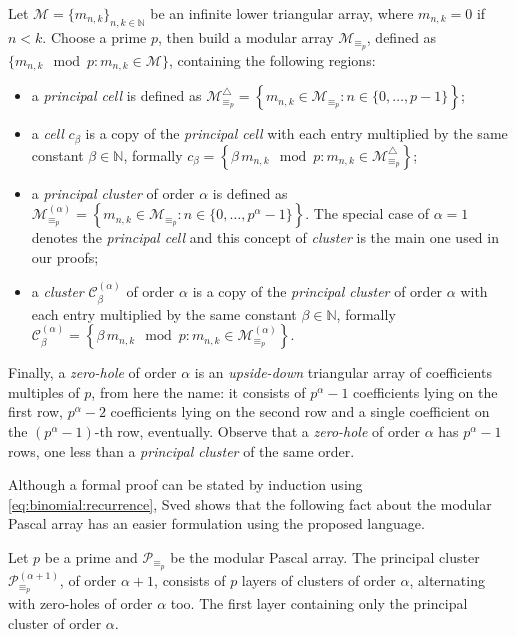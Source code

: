 Let $\mathcal{M}=\lbrace m_{n,k}\rbrace_{n,k\in\mathbb{N}}$ 
be an infinite lower triangular array, where $m_{n,k}=0$ if 
$n<k$. Choose a prime $p$, then build a modular array
$\mathcal{M}_{\equiv_{p}}$, defined as 
$\lbrace m_{n,k}\mod p : m_{n,k} \in \mathcal{M}\rbrace$, containing
the following regions:
\begin{itemize}

\item a \emph{principal cell} is %
    defined as
    $\mathcal{M}_{\equiv_{p}}^{\bigtriangleup} = 
        \left\lbrace m_{n,k}\in \mathcal{M}_{\equiv_{p}}: n\in\lbrace 0,\ldots,p-1\rbrace\right\rbrace$;

\item a \emph{cell} $c_{\beta}$ is a copy of the \emph{principal cell} with each entry multiplied 
by the same constant $\beta\in\mathbb{N}$, formally
    $c_{\beta}=\left\lbrace \beta\,m_{n,k}\mod p:m_{n,k}\in \mathcal{M}_{\equiv_{p}}^{\bigtriangleup}\right\rbrace$;

\item a \emph{principal cluster} of order $\alpha$ is %
    defined as
    $\mathcal{M}_{\equiv_{p}}^{(\alpha)} = 
        \left\lbrace m_{n,k}\in \mathcal{M}_{\equiv_{p}}: n\in\lbrace 0,\ldots,p^{\alpha}-1\rbrace\right\rbrace$. 
        The special case of $\alpha=1$ denotes the \emph{principal cell} and this concept of \emph{cluster}
        is the main one used in our proofs;

\item a \emph{cluster} $\mathcal{C}_{\beta}^{(\alpha)}$ of order $\alpha$ is a copy of the \emph{principal cluster}
of order $\alpha$ with each entry multiplied 
by the same constant $\beta\in\mathbb{N}$, formally 
    $\mathcal{C}_{\beta}^{(\alpha)}=\left\lbrace \beta\,m_{n,k}\mod p:m_{n,k}\in \mathcal{M}_{\equiv_{p}}^{(\alpha)}\right\rbrace$.

\end{itemize}

Finally, a \emph{zero-hole} of order $\alpha$ is an \emph{upside-down} triangular array of
coefficients multiples of $p$, from here the name: it consists of $p^{\alpha}-1$
coefficients lying on the first row, $p^{\alpha}-2$ coefficients lying on the second row
and a single coefficient on the $(p^{\alpha}-1)$-th row, eventually. 
Observe that a \emph{zero-hole} of order $\alpha$ has $p^{\alpha}-1$ rows, one less
than a \emph{principal cluster} of the same order.

Although a formal proof can be stated by induction using
\autoref{eq:binomial:recurrence}, Sved shows that the following fact 
about the modular Pascal array has an easier formulation using the proposed language.

\begin{theorem}
    Let $p$ be a prime and $\mathcal{P}_{\equiv_{p}}$ be the 
    modular Pascal array. The principal cluster $\mathcal{P}_{\equiv_{p}}^{(\alpha+1)}$,
    of order $\alpha + 1$, consists of $p$ layers of clusters of order $\alpha$, alternating
    with zero-holes of order $\alpha$ too. The first layer containing only the principal
    cluster of order $\alpha$.
\end{theorem}
